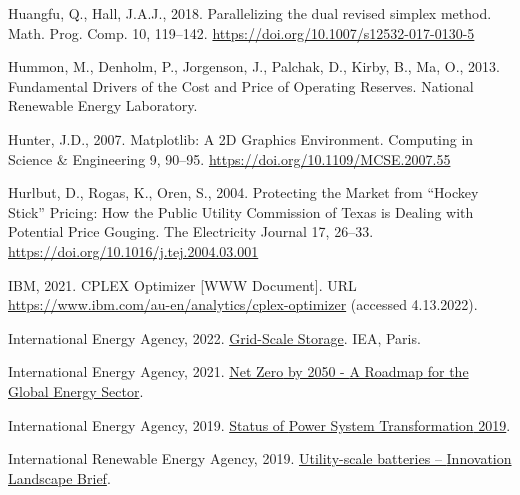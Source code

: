 \documentclass[12pt,a4paper,]{report}
\newlength{\cslhangindent}
\newenvironment{CSLReferences}[2] %
 {%
  \setlength{\parindent}{0pt}
  \ifodd #1 \everypar{\setlength{\hangindent}{\cslhangindent}}\ignorespaces\fi
  \ifnum #2 > 0
  \setlength{\parskip}{#2\baselineskip}
  \fi
 }%
 {}
\begin{document}
\begin{CSLReferences}{1}{0}
\leavevmode{}%
Huangfu, Q., Hall, J.A.J., 2018. Parallelizing the dual revised simplex
method. Math. Prog. Comp. 10, 119--142.
\url{https://doi.org/10.1007/s12532-017-0130-5}

\leavevmode{}%
Hummon, M., Denholm, P., Jorgenson, J., Palchak, D., Kirby, B., Ma, O.,
2013. Fundamental {Drivers} of the {Cost} and {Price} of {Operating
Reserves}. {National Renewable Energy Laboratory}.

\leavevmode{}%
Hunter, J.D., 2007. Matplotlib: {A 2D Graphics Environment}. Computing
in Science \& Engineering 9, 90--95.
\url{https://doi.org/10.1109/MCSE.2007.55}

\leavevmode{}%
Hurlbut, D., Rogas, K., Oren, S., 2004. Protecting the {Market} from
{``{Hockey Stick}''} {Pricing}: {How} the {Public Utility Commission} of
{Texas} is {Dealing} with {Potential Price Gouging}. The Electricity
Journal 17, 26--33. \url{https://doi.org/10.1016/j.tej.2004.03.001}

\leavevmode{}%
IBM, 2021. {CPLEX Optimizer} {[}WWW Document{]}. URL
\url{https://www.ibm.com/au-en/analytics/cplex-optimizer} (accessed
4.13.2022).

\leavevmode{}%
International Energy Agency, 2022.
\href{https://www.iea.org/fuels-and-technologies/energy-storage}{Grid-{Scale
Storage}}. {IEA}, {Paris}.

\leavevmode{}%
International Energy Agency, 2021.
\href{https://iea.blob.core.windows.net/assets/deebef5d-0c34-4539-9d0c-10b13d840027/NetZeroby2050-ARoadmapfortheGlobalEnergySector_CORR.pdf}{Net
{Zero} by 2050 - {A Roadmap} for the {Global Energy Sector}}.

\leavevmode{}%
International Energy Agency, 2019.
\href{https://iea.blob.core.windows.net/assets/00dd2818-65f1-426c-8756-9cc0409d89a8/Status_of_Power_System_Transformation_2019.pdf}{Status
of {Power System Transformation} 2019}.

\leavevmode{}%
International Renewable Energy Agency, 2019.
\href{https://www.irena.org/publications/2019/Sep/Utility-scale-batteries}{Utility-scale
batteries -- {Innovation Landscape Brief}}.


\end{CSLReferences}
\end{document}

